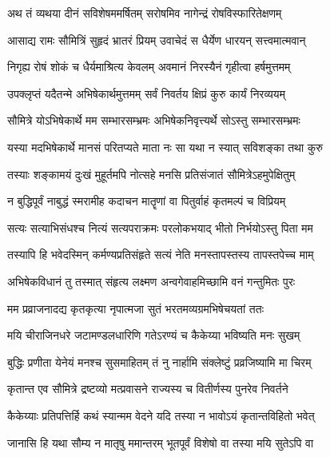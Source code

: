 
\twolineshloka
{अथ तं व्यथया दीनं सविशेषममर्षितम्}
{सरोषमिव नागेन्द्रं रोषविस्फारितेक्षणम्} %

\twolineshloka
{आसाद्य रामः सौमित्रिं सुहृदं भ्रातरं प्रियम्}
{उवाचेदं स धैर्येण धारयन् सत्त्वमात्मवान्} %

\twolineshloka
{निगृह्य रोषं शोकं च धैर्यमाश्रित्य केवलम्}
{अवमानं निरस्यैनं गृहीत्वा हर्षमुत्तमम्} %

\twolineshloka
{उपक्लृप्तं यदैतन्मे अभिषेकार्थमुत्तमम्}
{सर्वं निवर्तय क्षिप्रं कुरु कार्यं निरव्ययम्} %

\twolineshloka
{सौमित्रे योऽभिषेकार्थे मम सम्भारसम्भ्रमः}
{अभिषेकनिवृत्त्यर्थे सोऽस्तु सम्भारसम्भ्रमः} %

\twolineshloka
{यस्या मदभिषेकार्थे मानसं परितप्यते}
{माता नः सा यथा न स्यात् सविशङ्का तथा कुरु} %

\twolineshloka
{तस्याः शङ्कामयं दुःखं मुहूर्तमपि नोत्सहे}
{मनसि प्रतिसंजातं सौमित्रेऽहमुपेक्षितुम्} %

\twolineshloka
{न बुद्धिपूर्वं नाबुद्धं स्मरामीह कदाचन}
{मातॄणां वा पितुर्वाहं कृतमल्पं च विप्रियम्} %

\twolineshloka
{सत्यः सत्याभिसंधश्च नित्यं सत्यपराक्रमः}
{परलोकभयाद् भीतो निर्भयोऽस्तु पिता मम} %

\twolineshloka
{तस्यापि हि भवेदस्मिन् कर्मण्यप्रतिसंहृते}
{सत्यं नेति मनस्तापस्तस्य तापस्तपेच्च माम्} %

\twolineshloka
{अभिषेकविधानं तु तस्मात् संहृत्य लक्ष्मण}
{अन्वगेवाहमिच्छामि वनं गन्तुमितः पुरः} %

\twolineshloka
{मम प्रव्राजनादद्य कृतकृत्या नृपात्मजा}
{सुतं भरतमव्यग्रमभिषेचयतां ततः} %

\twolineshloka
{मयि चीराजिनधरे जटामण्डलधारिणि}
{गतेऽरण्यं च कैकेय्या भविष्यति मनः सुखम्} %

\twolineshloka
{बुद्धिः प्रणीता येनेयं मनश्च सुसमाहितम्}
{तं नु नार्हामि संक्लेष्टुं प्रव्रजिष्यामि मा चिरम्} %

\twolineshloka
{कृतान्त एव सौमित्रे द्रष्टव्यो मत्प्रवासने}
{राज्यस्य च वितीर्णस्य पुनरेव निवर्तने} %

\twolineshloka
{कैकेय्याः प्रतिपत्तिर्हि कथं स्यान्मम वेदने}
{यदि तस्या न भावोऽयं कृतान्तविहितो भवेत्} %

\twolineshloka
{जानासि हि यथा सौम्य न मातृषु ममान्तरम्}
{भूतपूर्वं विशेषो वा तस्या मयि सुतेऽपि वा} %

